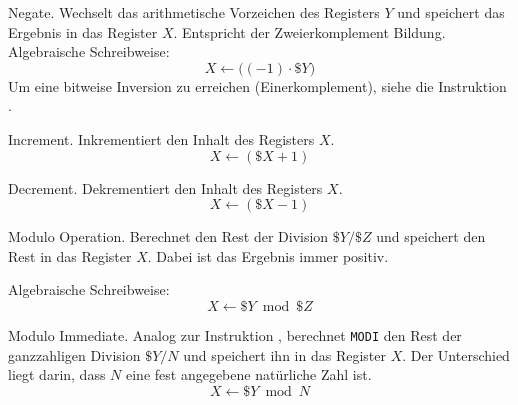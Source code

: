\glqq Negate\grqq.
Wechselt das arithmetische Vorzeichen des Registers $Y$ und speichert das
Ergebnis in das Register $X$. Entspricht der Zweierkomplement Bildung.
Algebraische Schreibweise:
\[
    X \gets \big( (-1) \cdot \$Y \big)
\]
Um eine bitweise Inversion zu erreichen (Einerkomplement), siehe die
Instruktion .



\glqq Increment\grqq.
Inkrementiert den Inhalt des Registers $X$.
\[
    X \gets ( \$X + 1 )
\]



\glqq Decrement\grqq.
Dekrementiert den Inhalt des Registers $X$.
\[
    X \gets ( \$X - 1 )
\]




Modulo Operation.
Berechnet den Rest der Division $\$Y/\$Z$ und speichert den Rest in das Register
$X$. Dabei ist das Ergebnis immer positiv.

Algebraische Schreibweise:
\[
    X \gets \$Y \bmod \$Z
\]


\glqq Modulo Immediate\grqq. Analog zur Instruktion , berechnet
\texttt{MODI} den Rest der ganzzahligen Division $\$Y/N$ und speichert ihn in
das Register $X$. Der Unterschied liegt darin, dass $N$ eine fest angegebene
natürliche Zahl ist.
\[
    X \gets \$Y \bmod N
\]

